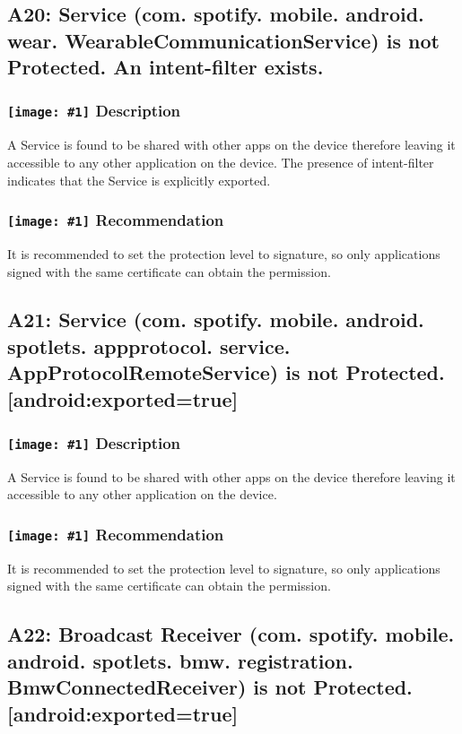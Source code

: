 \documentclass[12p]{article}
\newcommand{\icon}[1]{\texttt{[image: \#1]}}
\begin{document}
\subsection{A20: Service (com. spotify. mobile. android. wear. WearableCommunicationService) is not Protected. An intent-filter exists.}
\subsubsection*{\protect\icon{/home/miki/Documents/GITHUB/AndroidPermissions/python/vulns/report_icons/basic_sheet.png} Description}
A  Service is found to be shared with other apps on the device therefore leaving it accessible to any other application on the device. The presence of intent-filter indicates that the Service is explicitly exported.
\subsubsection*{\protect\icon{/home/miki/Documents/GITHUB/AndroidPermissions/python/vulns/report_icons/basic_todo.png} Recommendation}
It is recommended to set the protection level to signature, so only applications signed with the same certificate can obtain the permission.
\subsection{A21: Service (com. spotify. mobile. android. spotlets. appprotocol. service. AppProtocolRemoteService) is not Protected. [android:exported=true]}
\subsubsection*{\protect\icon{/home/miki/Documents/GITHUB/AndroidPermissions/python/vulns/report_icons/basic_sheet.png} Description}
A Service is found to be shared with other apps on the device therefore leaving it accessible to any other application on the device.
\subsubsection*{\protect\icon{/home/miki/Documents/GITHUB/AndroidPermissions/python/vulns/report_icons/basic_todo.png} Recommendation}
It is recommended to set the protection level to signature, so only applications signed with the same certificate can obtain the permission.
\subsection{A22: Broadcast Receiver (com. spotify. mobile. android. spotlets. bmw. registration. BmwConnectedReceiver) is not Protected. [android:exported=true]}
\end{document}
